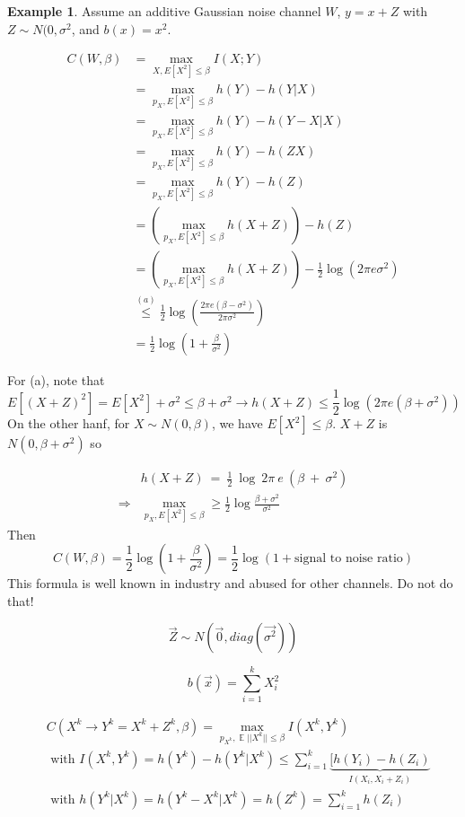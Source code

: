 \documentclass{article}
\theoremstyle{definition} %
\newtheorem{example}{Example}
\newcommand{\Ex}[1]{E\left[#1\right]}
\newcommand{\pfrac}[2]{\left( \frac{#1}{#2} \right)}
\DeclareMathOperator{\E}{\mathbb{E}}%
\begin{document}
\begin{example}
  Assume an additive Gaussian noise channel $W$, $y=x+Z$ with $Z \sim N(0, \sigma^2$, and $b(x) = x^2$.

  \begin{align*}
    C(W, \beta) &= \max_{X, \Ex{X^2} \leq \beta} I(X;Y) \\
    &= \max_{p_X, \Ex{X^2} \leq \beta} h(Y) - h(Y|X) \\
    &= \max_{p_X, \Ex{X^2} \leq \beta} h(Y) - h(Y-X|X) \\
    &= \max_{p_X, \Ex{X^2} \leq \beta} h(Y) - h(ZX) \\
    &= \max_{p_X, \Ex{X^2} \leq \beta} h(Y) - h(Z) \\
    &= \left(\max_{p_X, \Ex{X^2} \leq \beta} h(X+Z)\right) - h(Z) \\
    &= \left(\max_{p_X, \Ex{X^2} \leq \beta} h(X+Z)\right) - \frac 1 2 \log(2\pi e \sigma^2) \\
    &\overset{(a)}\leq \frac 1 2 \log \pfrac{2\pi e (\beta - \sigma^2)}{2\pi \sigma^2}\\
    &= \frac 1 2 \log \left(1 + \frac \beta {\sigma^2}\right)
  \end{align*}

  For (a), note that
  \[
    \Ex{(X+Z)^2} = \Ex{X^2} + \sigma^2 \leq \beta + \sigma^2 \to h(X+Z) \leq \frac 1 2 \log (2\pi e (\beta + \sigma^2))
  \]
  On the other hanf, for $X \sim N(0, \beta)$, we have $\Ex{X^2}\leq \beta$. $X+Z$ is $N(0, \beta+\sigma^2)$ so

  \begin{align*}
    &h(X+Z)~=~\frac 1 2~\log~2\pi~e~(\beta~+~\sigma^2)\\
\Rightarrow&\max_{p_X, \Ex{X^2} \leq \beta} \geq \frac 1 2 \log \frac {\beta + \sigma^2} {\sigma^2}
  \end{align*}
  Then
  \[
    C(W,\beta)= \frac 1 2 \log\left(1 + \frac \beta {\sigma^2} \right) = \frac 1 2 \log(1 + \text{signal to noise ratio})
  \]
  This formula is well known in industry and abused for other channels. Do not do that!
\end{example}




\[
  \vec{Z} \sim N(\vec{0}, diag(\vec{\sigma^2}))
\]

\[
  b(\vec{x}) = \sum_{i = 1}^k X_i^2
\]

\begin{align*}
  &C(X^k \rightarrow Y^k = X^k + Z^k, \beta) = \max_{p_{X^k}, \E{||X^k||} \leq \beta} I(X^k, Y^k) \\
  & \text{ with } I(X^k, Y^k) = h(Y^k) - h(Y^k | X^k) \leq \sum_{i = 1}^k \underbrace{[h(Y_i) - h(Z_i)}_{I(X_i, X_i + Z_i)} \\
  & \text{ with } h(Y^k | X^k) = h(Y^k - X^k | X^k) = h(Z^k) = \sum_{i = 1}^k h(Z_i)
\end{align*}
\end{document}
